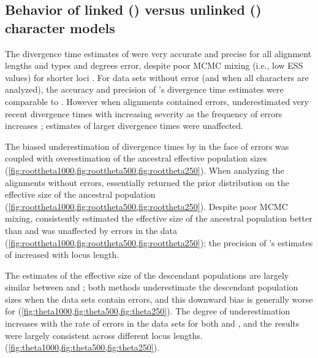 

\subsection{Behavior of linked (\beast) versus unlinked (\ecoevolity) character
    models}
The divergence time estimates of \beast were very accurate and precise for all
alignment lengths and types and degrees error, despite poor MCMC mixing (i.e.,
low ESS values) for shorter loci \timefigsp. 
For data sets without error (and when all characters are analyzed), the
accuracy and precision of \ecoevolity's divergence time estimates were
comparable to \beast \timefigsp.
However when alignments contained errors, \ecoevolity underestimated very
recent divergence times with increasing severity as the frequency of errors
increases \timefigsp; estimates of larger divergence times were unaffected.

The biased underestimation of divergence times by \ecoevolity in the face of
errors was coupled with overestimation of the ancestral effective population
sizes (\cref{fig:roottheta1000,fig:roottheta500,fig:roottheta250}).
When analyzing the alignments without errors, \ecoevolity essentially returned
the prior distribution on the effective size of the ancestral population
(\cref{fig:roottheta1000,fig:roottheta500,fig:roottheta250}).
Despite poor MCMC mixing, \beast consistently estimated the effective size of
the ancestral population better than \ecoevolity and was unaffected by errors
in the data
(\cref{fig:roottheta1000,fig:roottheta500,fig:roottheta250});
the precision of \beast's estimates of \rootpopsize increased with locus
length.

The estimates of the effective size of the descendant populations
are largely similar between \beast and \ecoevolity;
both methods underestimate the descendant population sizes when
the data sets contain errors, and this downward bias is generally
worse for \ecoevolity
(\cref{fig:theta1000,fig:theta500,fig:theta250}).
The degree of underestimation increases with the rate of errors in the data
sets for both \beast and \ecoevolity, and the results were largely consistent
across different locus lengths.
(\cref{fig:theta1000,fig:theta500,fig:theta250}).



